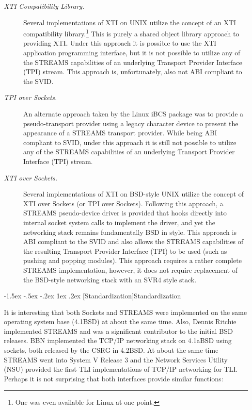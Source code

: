 \documentclass[letterpaper,final,notitlepage,twocolumn,10pt,twoside]{article}
\makeatletter
\renewcommand\subsection{\@startsection{subsection}{2}{\z@}%
                                     {-1.5ex \@plus -.5ex \@minus -.2ex}%
                                     {1ex \@plus .2ex}%
                                     {\normalfont\normalsize\bfseries}}
\makeatother
\begin{document}
\begin{description}

\item[{\it XTI Compatibility Library.}]

Several implementations of XTI on UNIX utilize the concept of an XTI
compatibility library.\footnote{One was even available for Linux at one
point.}  This is purely a shared object library approach to providing XTI.
Under this approach it is possible to use the XTI application programming
interface, but it is not possible to utilize any of the STREAMS capabilities
of an underlying Transport Provider Interface (TPI) stream.  This approach is,
unfortunately, also not ABI compliant to the SVID.

\item[{\it TPI over Sockets.}]

An alternate approach taken by the Linux iBCS package was to provide a
pseudo-transport provider using a legacy character device to present the
appearance of a STREAMS transport provider.  While being ABI compliant to
SVID, under this approach it is still not possible to utilize any of the
STREAMS capabilities of an underlying Transport Provider Interface (TPI)
stream.

\item[{\it XTI over Sockets.}]

Several implementations of XTI on BSD-style UNIX utilize the concept of XTI
over Sockets (or TPI over Sockets).  Following this approach, a STREAMS
pseudo-device driver is provided that hooks directly into internal socket
system calls to implement the driver, and yet the networking stack remains
fundamentally BSD in style.  This approach is ABI compliant to the SVID and
also allows the STREAMS capabilities of the resulting Transport Provider
Interface (TPI) to be used (such as pushing and popping modules).  This
approach requires a rather complete STREAMS implementation, however, it does
not require replacement of the BSD-style networking stack with an SVR4 style
stack.

\end{description}

\subsection[Standardization]{Standardization}

It is interesting that both Sockets and STREAMS were implemented on the same
operating system base (4.1BSD) at about the same time.  Also, Dennis Ritchie
implemented STREAMS and was a significant contributor to the initial BSD
releases.  BBN implemented the TCP/IP networking stack on 4.1aBSD using
sockets, both released by the CSRG in 4.2BSD.  At about the same time STREAMS
went into System V Release 3 and the Network Services Utility (NSU) provided
the first TLI implementations of TCP/IP networking for TLI.  Perhaps it is not
surprising that both interfaces provide similar functions:
\end{document}
